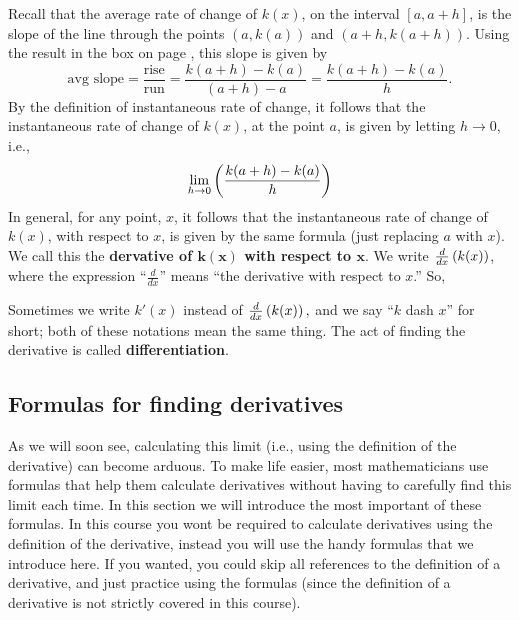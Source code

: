 \noindent Recall that the average rate of change of $k(x)$, on the interval $[a,a+h]$, is the slope of the line through the points $(a,k(a))$ and $(a+h,k(a+h))$. Using the result in the box on page \pageref{avg slope}, this slope is given by
\[
\text{avg slope} = \frac{\text{rise}}{\text{run}} = \frac{k(a+h) - k(a)}{(a + h) - a} = \frac{k(a+h) - k(a)}{h}.
\]
By the definition of instantaneous rate of change, it follows that the instantaneous rate of change of $k(x)$, at the point $a$, is given by letting $h \rightarrow 0$, i.e., 
\[
\lim_{h \rightarrow 0}\left(\frac{k(a+h) - k(a)}{h}\right)
\]
In general, for any point, $x$, it follows that the instantaneous rate of change of $k(x)$, with respect to $x$, is given by the same formula (just replacing $a$ with $x$). We call this the \textbf{dervative of $\boldsymbol{k(x)}$ with respect to $\boldsymbol{x}$}. We write $\frac{d}{dx}\left(k(x)\right)$, where the expression ``$\frac{d}{dx}$'' means ``the derivative with respect to $x$.'' So,  \label{derivative}

  	\bigskip
	
	\hfil{}
	\bigskip
	\bigskip
	
\noindent Sometimes we write $k'(x)$ instead of $\frac{d}{dx}\left(k(x)\right),$ and we say ``$k$ dash $x$'' for short; both of these notations mean the same thing. The act of finding the derivative is called \textbf{differentiation}. \label{differentiation} \\


\subsection{Formulas for finding derivatives} \label{derivative formulas}
As we will soon see, calculating this limit (i.e., using the definition of the derivative) can become arduous. To make life easier, most mathematicians use formulas that help them calculate derivatives without having to carefully find this limit each time. In this section we will introduce the most important of these formulas. In this course you wont be required to calculate derivatives using the definition of the derivative, instead you will use the handy formulas that we introduce here. If you wanted, you could skip all references to the definition of a derivative, and just practice using the formulas (since the definition of a derivative is not strictly covered in this course).

